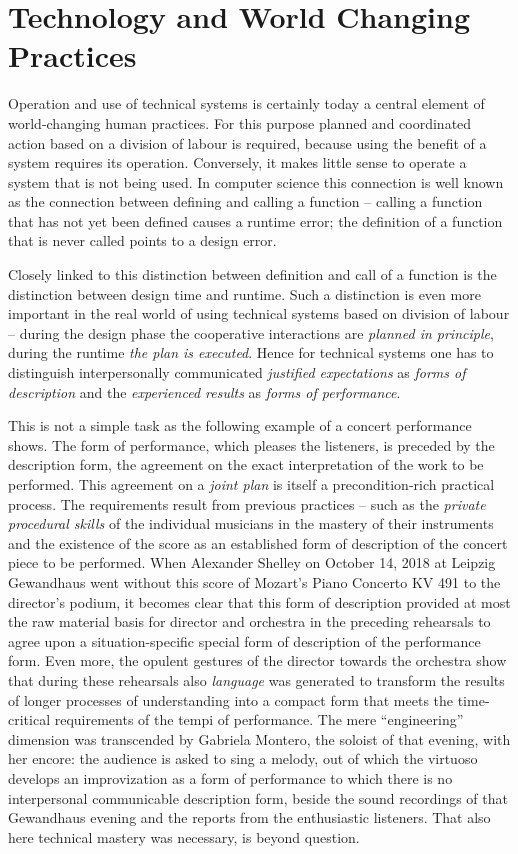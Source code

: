 \documentclass{llncs}
\begin{document}
\section{Technology and World Changing Practices}

Operation and use of technical systems is certainly today a central element of
world-changing human practices. For this purpose planned and coordinated
action based on a division of labour is required, because using the benefit of
a system requires its operation. Conversely, it makes little sense to operate
a system that is not being used. In computer science this connection is well
known as the connection between defining and calling a function -- calling a
function that has not yet been defined causes a runtime error; the definition
of a function that is never called points to a design error.

Closely linked to this distinction between definition and call of a function
is the distinction between design time and runtime. Such a distinction is even
more important in the real world of using technical systems based on division
of labour -- during the design phase the cooperative interactions are
\emph{planned in principle}, during the runtime \emph{the plan is executed}.
Hence for technical systems one has to distinguish interpersonally
communicated \emph{justified expectations} as \emph{forms of description} and
the \emph{experienced results} as \emph{forms of performance}.

This is not a simple task as the following example of a concert performance
shows. The form of performance, which pleases the listeners, is preceded by
the description form, the agreement on the exact interpretation of the work to
be performed. This agreement on a \emph{joint plan} is itself a
precondition-rich practical process. The requirements result from previous
practices -- such as the \emph{private procedural skills} of the individual
musicians in the mastery of their instruments and the existence of the score
as an established form of description of the concert piece to be
performed. When Alexander Shelley on October 14, 2018 at Leipzig Gewandhaus
went without this score of Mozart's Piano Concerto KV 491 to the director's
podium, it becomes clear that this form of description provided at most the
raw material basis for director and orchestra in the preceding rehearsals to
agree upon a situation-specific special form of description of the performance
form. Even more, the opulent gestures of the director towards the orchestra
show that during these rehearsals also \emph{language} was generated to
transform the results of longer processes of understanding into a compact form
that meets the time-critical requirements of the tempi of performance.  The
mere ``engineering'' dimension was transcended by Gabriela Montero, the
soloist of that evening, with her encore: the audience is asked to sing a
melody, out of which the virtuoso develops an improvization as a form of
performance to which there is no interpersonal communicable description form,
beside the sound recordings of that Gewandhaus evening and the reports from
the enthusiastic listeners. That also here technical mastery was necessary, is
beyond question.
\end{document}
